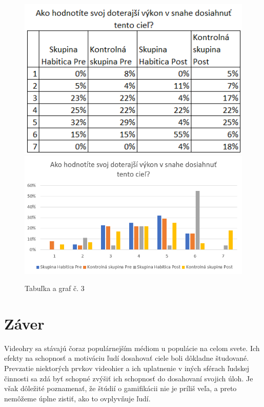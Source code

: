 \documentclass[10pt,twoside,slovak,a4paper]{article}
\begin{document}
\begin{figure}[h]
	\caption{Tabuľka a graf č. 3}
	\includegraphics[scale=0.7]{vykonTable.png}
	\includegraphics[scale=0.5]{vykon.png}
	\centering
\end{figure}

\section{Záver} \label{conclusion}
Videohry sa stávajú čoraz populárnejším médiom u populácie na celom svete. 
Ich efekty na schopnosť a motiváciu ľudí dosahovať ciele boli dôkladne študované. 
Prevzatie niektorých prvkov videohier a ich uplatnenie v iných sférach ľudskej 
činnosti sa zdá byť schopné zvýšiť ich schopnosť do dosahovaní svojich úloh. 
Je však dôležité poznamenať, že štúdií o gamifikácii nie je príliš veľa, a 
preto nemôžeme úplne zistiť, ako to ovplyvňuje ľudí.


\end{document}
